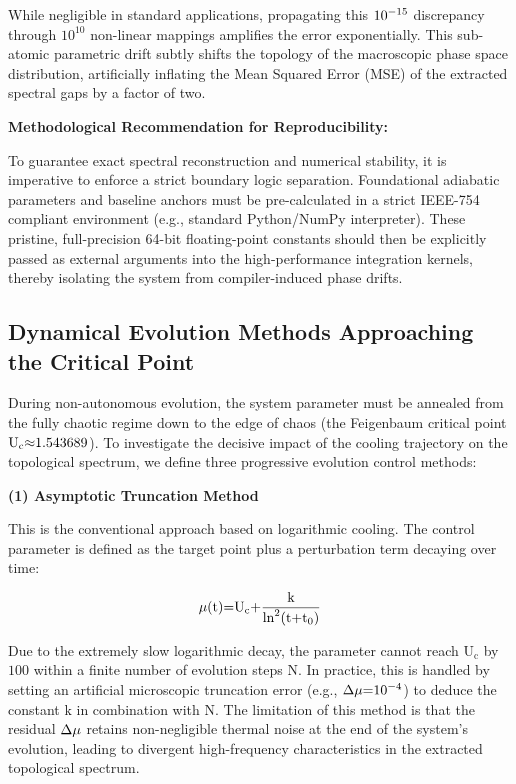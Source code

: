 \documentclass[fleqn,10pt]{wlscirep}
\begin{document}
While negligible in standard applications, propagating this
\(\text{10}^{\text{\ensuremath{-}15}}\) discrepancy through \(\text{10}^{\text{10}}\)
non-linear mappings amplifies the error exponentially. This sub-atomic
parametric drift subtly shifts the topology of the macroscopic phase
space distribution, artificially inflating the Mean Squared Error (MSE)
of the extracted spectral gaps by a factor of two.

\textbf{Methodological Recommendation for Reproducibility:}

To guarantee exact spectral reconstruction and numerical stability, it
is imperative to enforce a strict boundary logic separation.
Foundational adiabatic parameters and baseline anchors must be
pre-calculated in a strict IEEE-754 compliant environment (e.g.,
standard Python/NumPy interpreter). These pristine, full-precision
64-bit floating-point constants should then be explicitly passed as
external arguments into the high-performance integration kernels,
thereby isolating the system from compiler-induced phase drifts.

\subsection*{Dynamical Evolution Methods Approaching the Critical Point}

During non-autonomous evolution, the system parameter must be annealed
from the fully chaotic regime down to the edge of chaos (the Feigenbaum
critical point \(\text{U}_{\text{c}}\text{\ensuremath{\approx}1.543689}\)). To investigate
the decisive impact of the cooling trajectory on the topological
spectrum, we define three progressive evolution control methods:

\textbf{(1) Asymptotic Truncation Method}

This is the conventional approach based on logarithmic cooling. The
control parameter is defined as the target point plus a perturbation
term decaying over time:

\[\text{\ensuremath{\mu}}\text{(}\text{t}\text{)=}\text{U}_{\text{c}}\text{+}\frac{\text{k}}{\text{ln}^{\text{2}}\text{(}\text{t}\text{+}\text{t}_{\text{0}}\text{)}}\]

Due to the extremely slow logarithmic decay, the parameter cannot reach
\(\text{U}_{\text{c}}\) by \(\text{100}\) within a finite number of
evolution steps \(\text{N}\). In practice, this is handled by setting an
artificial microscopic truncation error (e.g.,
\(\text{\ensuremath{\Delta}}\text{\ensuremath{\mu}}\text{=}\text{10}^{\text{\ensuremath{-}4}}\)) to deduce the
constant \(\text{k}\) in combination with \(\text{N}\). The limitation
of this method is that the residual \(\text{\ensuremath{\Delta}}\text{\ensuremath{\mu}}\) retains
non-negligible thermal noise at the end of the system's evolution,
leading to divergent high-frequency characteristics in the extracted
topological spectrum.
\end{document}
